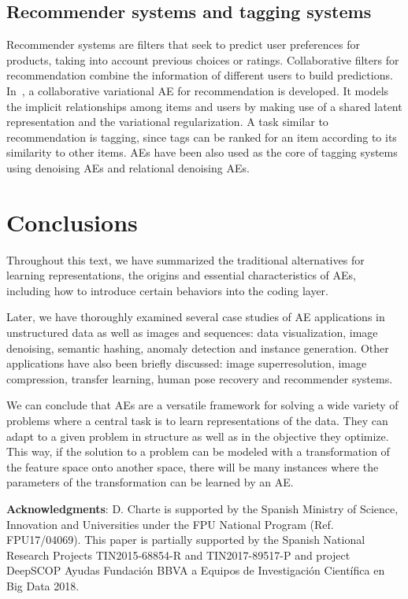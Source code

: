 \subsection{Recommender systems and tagging systems} Recommender systems are filters that seek to predict user preferences for products, taking into account previous choices or ratings. Collaborative filters for recommendation combine the information of different users to build predictions. In~\cite{li2017collaborative}, a collaborative variational AE for recommendation is developed. It models the implicit relationships among items and users by making use of a shared latent representation and the variational regularization. A task similar to recommendation is tagging, since tags can be ranked for an item according to its similarity to other items. AEs have been also used as the core of tagging systems~\cite{wang2015relational} using denoising AEs and relational denoising AEs.

\section{Conclusions}\label{p5sec:co}

Throughout this text, we have summarized the traditional alternatives for learning representations, the origins and essential characteristics of AEs, including how to introduce certain behaviors into the coding layer. 

Later, we have thoroughly examined several case studies of AE applications in unstructured data as well as images and sequences: data visualization, image denoising, semantic hashing, anomaly detection and instance generation. Other applications have also been briefly discussed: image superresolution, image compression, transfer learning, human pose recovery and recommender systems. 

We can conclude that AEs are a versatile framework for solving a wide variety of problems where a central task is to learn representations of the data. They can adapt to a given problem in structure as well as in the objective they optimize. This way, if the solution to a problem can be modeled with a transformation of the feature space onto another space, there will be many instances where the parameters of the transformation can be learned by an AE.

\textbf{Acknowledgments}: D. Charte is supported by the Spanish Ministry of Science, Innovation and Universities under the FPU National Program (Ref. FPU17/04069). This paper is partially supported by the Spanish National Research Projects TIN2015-68854-R and TIN2017-89517-P and project DeepSCOP Ayudas
Fundaci{\'o}n BBVA a Equipos de Investigaci{\'o}n Cient{\'i}fica en Big Data
2018.

